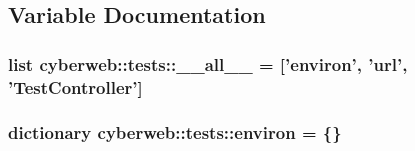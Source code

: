 \subsection{\-Variable \-Documentation}
\hypertarget{namespacecyberweb_1_1tests_a1eaf7ae369e94b3a5ada80b3a71f55e5}{
\subsubsection[{\-\_\-\-\_\-all\-\_\-\-\_\-}]{\setlength{\rightskip}{0pt plus 5cm}list {\bf cyberweb\-::tests\-::\-\_\-\-\_\-all\-\_\-\-\_\-} = \mbox{[}'{\bf environ}', 'url', '{\bf \-Test\-Controller}'\mbox{]}}}\label{namespacecyberweb_1_1tests_a1eaf7ae369e94b3a5ada80b3a71f55e5}
\hypertarget{namespacecyberweb_1_1tests_a9c7e581447f8cbf5f2a6ce39f160ad9e}{
\subsubsection[{environ}]{\setlength{\rightskip}{0pt plus 5cm}dictionary {\bf cyberweb\-::tests\-::environ} = \{\}}}\label{namespacecyberweb_1_1tests_a9c7e581447f8cbf5f2a6ce39f160ad9e}
